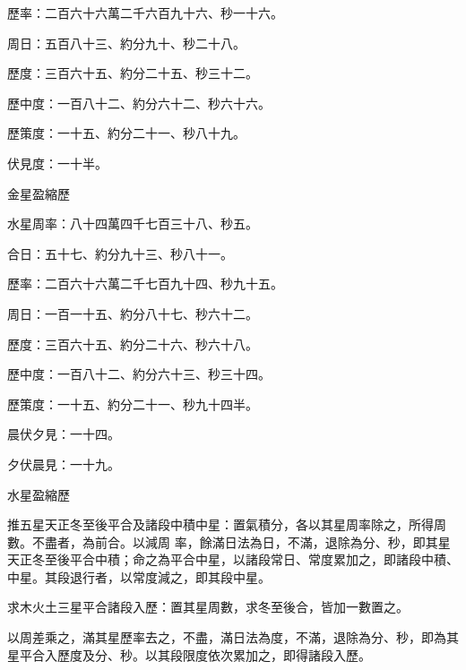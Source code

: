 \begin{pinyinscope}
 歷率：二百六十六萬二千六百九十六、秒一十六。



 周日：五百八十三、約分九十、秒二十八。



 歷度：三百六十五、約分二十五、秒三十二。



 歷中度：一百八十二、約分六十二、秒六十六。



 歷策度：一十五、約分二十一、秒八十九。



 伏見度：一十半。



 金星盈縮歷



 水星周率：八十四萬四千七百三十八、秒五。



 合日：五十七、約分九十三、秒八十一。



 歷率：二百六十六萬二千七百九十四、秒九十五。



 周日：一百一十五、約分八十七、秒六十二。



 歷度：三百六十五、約分二十六、秒六十八。



 歷中度：一百八十二、約分六十三、秒三十四。



 歷策度：一十五、約分二十一、秒九十四半。



 晨伏夕見：一十四。



 夕伏晨見：一十九。



 水星盈縮歷



 推五星天正冬至後平合及諸段中積中星：置氣積分，各以其星周率除之，所得周數。不盡者，為前合。以減周
 率，餘滿日法為日，不滿，退除為分、秒，即其星天正冬至後平合中積；命之為平合中星，以諸段常日、常度累加之，即諸段中積、中星。其段退行者，以常度減之，即其段中星。



 求木火土三星平合諸段入歷：置其星周數，求冬至後合，皆加一數置之。



 以周差乘之，滿其星歷率去之，不盡，滿日法為度，不滿，退除為分、秒，即為其星平合入歷度及分、秒。以其段限度依次累加之，即得諸段入歷。




\end{pinyinscope}
